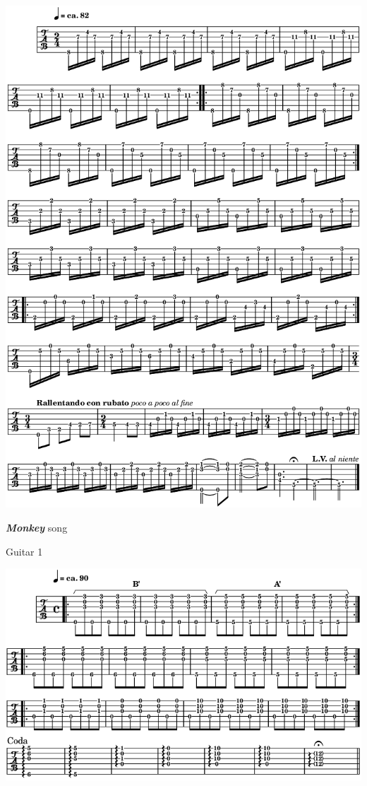 \begin{center}
\includegraphics[width=\textwidth]{img/neC1}
\end{center}

\newpage

\textbf{\textsl{Monkey}} song  

\bigskip

 \quad Guitar 1

\begin{center}
\includegraphics[width=\textwidth]{img/neE1}
\end{center}

